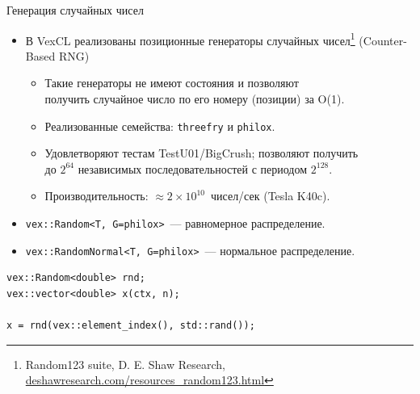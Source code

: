 \documentclass[@BEAMER_OPTIONS@]{beamer}
\newcommand{\code}[1]{\lstinline|#1|}
\begin{document}
\begin{frame}[fragile]{Генерация случайных чисел}
    \begin{itemize}
        \item В VexCL реализованы позиционные генераторы случайных
            чисел\footnote{Random123 suite, D. E. Shaw Research,
            \href{http://www.deshawresearch.com/resources\_random123.html}{deshawresearch.com/resources\_random123.html}}
            (Counter-Based RNG)
            \begin{itemize}
                \item Такие генераторы не имеют состояния и позволяют\\
                    получить случайное число по его номеру (позиции) за O(1).
                \item Реализованные семейства: \code{threefry} и \code{philox}.
                \item Удовлетворяют тестам TestU01/BigCrush; позволяют
                    получить\\ до \alert{$2^{64}$} независимых
                    последовательностей с периодом \alert{$2^{128}$}.
                \item Производительность: \alert{$\approx
                    2\times10^{10}$}~чисел/сек (Tesla K40c).
            \end{itemize}
        \item \code{vex::Random<T, G=philox>}~--- равномерное распределение.
        \item \code{vex::RandomNormal<T, G=philox>}~--- нормальное распределение.
    \end{itemize}
    \begin{exampleblock}{}
        \begin{lstlisting}
vex::Random<double> rnd;
vex::vector<double> x(ctx, n);

x = rnd(vex::element_index(), std::rand());
        \end{lstlisting}
    \end{exampleblock}
\end{frame}

\end{document}
